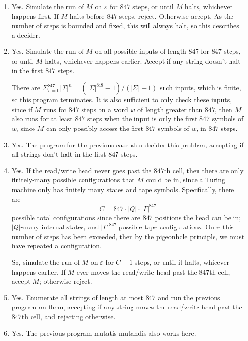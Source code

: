 \documentclass{article}
\theoremstyle{definition}
\theoremstyle{definition}
\theoremstyle{remark}
\begin{document}
\begin{enumerate}
    \item[$(i)$] Yes. Simulate the run of $M$ on $\varepsilon$ for $847$ steps, or until $M$ halts, whichever happens first. If $M$ halts before $847$ steps, reject. Otherwise accept. As the number of steps is bounded and fixed, this will always halt, so this describes a decider.

    \item[$(ii)$] Yes. Simulate the run of $M$ on all possible inputs of length $847$ for $847$ steps, or until $M$ halts, whichever happens earlier. Accept if any string doesn't halt in the first $847$ steps.
    
    There are $\Sigma_{n=0}^{847}|\Sigma|^n=(|\Sigma|^{848}-1)/(|\Sigma|-1)$ such inputs, which is finite, so this program terminates. It is also sufficient to only check these inputs, since if $M$ runs for $847$ steps on a word $w$ of length greater than $847$, then $M$ also runs for at least $847$ steps when the input is only the first $847$ symbols of $w$, since $M$ can only possibly access the first $847$ symbols of $w$, in $847$ steps.

    \item[$(iii)$] Yes. The program for the previous case also decides this problem, accepting if all strings don't halt in the first $847$ steps.

    \item[$(iv)$] Yes. If the read/write head never goes past the $847$th cell, then there are only finitely-many possible configurations that $M$ could be in, since a Turing machine only has finitely many states and tape symbols. Specifically, there are
    \begin{equation*}
        C=847\cdot|Q|\cdot|\Gamma|^{847}
    \end{equation*}
    possible total configurations since there are $847$ positions the head can be in; $|Q|$-many internal states; and $|\Gamma|^{847}$ possible tape configurations. Once this number of steps has been exceeded, then by the pigeonhole principle, we must have repeated a configuration.
    
    So, simulate the run of $M$ on $\varepsilon$ for $C+1$ steps, or until it halts, whicever happens earlier. If $M$ ever moves the read/write head past the $847$th cell, accept $M$; otherwise reject.

    \item[$(v)$] Yes. Enumerate all strings of length at most $847$ and run the previous program on them, accepting if any string moves the read/write head past the $847$th cell, and rejecting otherwise.
    
    \item[$(vi)$] Yes. The previous program mutatis mutandis also works here.
\end{enumerate}
\end{document}
